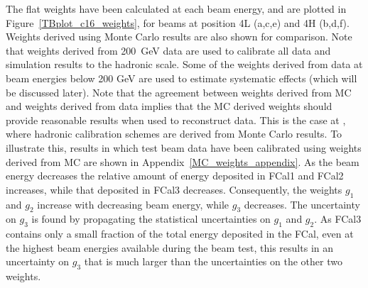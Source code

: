 The flat weights have been calculated at each beam energy, and are plotted in Figure~\ref{TBplot_c16_weights}, for beams at position 4L (a,c,e) and 4H (b,d,f). Weights derived using Monte Carlo results are also shown for comparison. 
Note that weights derived from 200~GeV data are used to calibrate all data and simulation results to the hadronic scale. Some of the weights derived from data at beam energies below 200 GeV are used to estimate systematic effects (which will be discussed later). Note that the agreement between weights derived from MC and weights derived from data implies that the MC derived weights should provide reasonable results when used to reconstruct data. This is the case at \atlas, where hadronic calibration schemes are derived from Monte Carlo results. To illustrate this, results in which test beam data have been calibrated using weights derived from MC are shown in Appendix~\ref{MC_weights_appendix}.  As the beam energy decreases the relative amount of energy deposited in FCal1 and FCal2 increases, while that deposited in FCal3 decreases. Consequently, the weights $g_1$ and $g_2$ increase with decreasing beam energy, while $g_3$ decreases.   The uncertainty on $g_3$ is found by propagating the statistical uncertainties on $g_1$ and $g_2$. As FCal3 contains only a small fraction of the total energy deposited in the FCal, even at the highest beam energies available during the beam test, this results in an uncertainty on $g_3$ that is much larger than the uncertainties on the other two weights.






